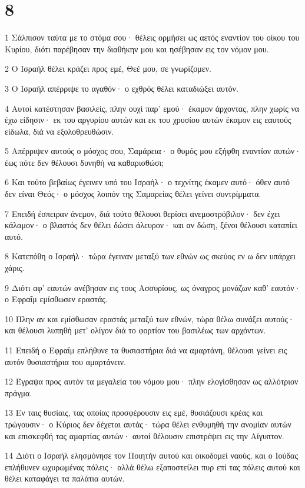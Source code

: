 \chapter{8}

\par 1 Σάλπισον ταύτα με το στόμα σου· θέλεις ορμήσει ως αετός εναντίον του οίκου του Κυρίου, διότι παρέβησαν την διαθήκην μου και ησέβησαν εις τον νόμον μου.
\par 2 Ο Ισραήλ θέλει κράζει προς εμέ, Θεέ μου, σε γνωρίζομεν.
\par 3 Ο Ισραήλ απέρριψε το αγαθόν· ο εχθρός θέλει καταδιώξει αυτόν.
\par 4 Αυτοί κατέστησαν βασιλείς, πλην ουχί παρ' εμού· έκαμον άρχοντας, πλην χωρίς να έχω είδησιν· εκ του αργυρίου αυτών και εκ του χρυσίου αυτών έκαμον εις εαυτούς είδωλα, διά να εξολοθρευθώσιν.
\par 5 Απέρριψεν αυτούς ο μόσχος σου, Σαμάρεια· ο θυμός μου εξήφθη εναντίον αυτών· έως πότε δεν θέλουσι δυνηθή να καθαρισθώσι;
\par 6 Και τούτο βεβαίως έγεινεν υπό του Ισραήλ· ο τεχνίτης έκαμεν αυτό· όθεν αυτό δεν είναι Θεός· ο μόσχος λοιπόν της Σαμαρείας θέλει γείνει συντρίμματα.
\par 7 Επειδή έσπειραν άνεμον, διά τούτο θέλουσι θερίσει ανεμοστρόβιλον· δεν έχει κάλαμον· ο βλαστός δεν θέλει δώσει άλευρον· και αν δώση, ξένοι θέλουσι καταπίει αυτό.
\par 8 Κατεπόθη ο Ισραήλ· τώρα έγειναν μεταξύ των εθνών ως σκεύος εν ω δεν υπάρχει χάρις.
\par 9 Διότι αφ' εαυτών ανέβησαν εις τους Ασσυρίους, ως όναγρος μονάζων καθ' εαυτόν· ο Εφραΐμ εμίσθωσεν εραστάς.
\par 10 Πλην αν και εμίσθωσαν εραστάς μεταξύ των εθνών, τώρα θέλω συνάξει αυτούς· και θέλουσι λυπηθή μετ' ολίγον διά το φορτίον του βασιλέως των αρχόντων.
\par 11 Επειδή ο Εφραΐμ επλήθυνε τα θυσιαστήρια διά να αμαρτάνη, θέλουσι γείνει εις αυτόν θυσιαστήρια του αμαρτάνειν.
\par 12 Έγραψα προς αυτόν τα μεγαλεία του νόμου μου· πλην ελογίσθησαν ως αλλότριον πράγμα.
\par 13 Εν ταις θυσίαις, τας οποίας προσφέρουσιν εις εμέ, θυσιάζουσι κρέας και τρώγουσιν· ο Κύριος δεν δέχεται αυτάς· τώρα θέλει ενθυμηθή την ανομίαν αυτών και επισκεφθή τας αμαρτίας αυτών· αυτοί θέλουσιν επιστρέψει εις την Αίγυπτον.
\par 14 Διότι ο Ισραήλ ελησμόνησε τον Ποιητήν αυτού και οικοδομεί ναούς, και ο Ιούδας επλήθυνεν ωχυρωμένας πόλεις· αλλά θέλω εξαποστείλει πυρ επί τας πόλεις αυτού και θέλει καταφάγει τα παλάτια αυτών.

